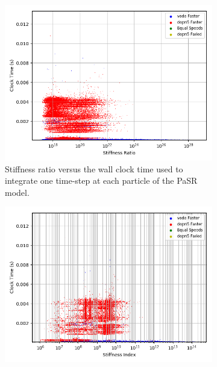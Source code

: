 \documentclass[12pt]{ussci}
\begin{document}
\begin{figure}[htbp]
   \centering
   \begin{subfigure}{0.43\textwidth}
       \includegraphics[width=\linewidth]{GRI_Mech_3/PaSR_Int_Times_Ratio_Groupings_1e-08.png}
       \caption{Stiffness ratio versus the wall clock time used to integrate one time-step at each particle of the PaSR model.}
       \label{fig:SRGRIPaSR}
   \end{subfigure}
    \hfill
   \begin{subfigure}{0.43\textwidth}
       \includegraphics[width=\linewidth]{GRI_Mech_3/PaSR_Int_Times_Index_Groupings_1e-08.png}

\end{subfigure}
\end{figure}
\end{document}
